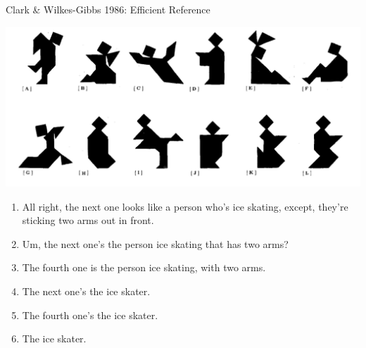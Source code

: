 \documentclass[ 12pt, xcolor=beamer,table,usenames,dvipsnames, ignorenonframetext, ngerman]{beamer}
\begin{document}
\begin{frame}{\large Clark \& Wilkes-Gibbs 1986: Efficient Reference}
	\pause
	\vspace{-.2cm}
	\begin{center}
		\includegraphics[width=.7\textwidth]{../images/clark_tangrams.png}
	\end{center}
	\vspace{-.4cm}
	\pause
	\begin{small}
		\begin{enumerate}
			\setlength{\itemsep}{-2pt}
			
			\item All right, the next one looks like a person who's ice skating, except, they're sticking two arms out in front. \pause
			\item Um, the next one's the person ice skating that has two arms? \pause
			\item The fourth one is the person ice skating, with two arms. \pause
			\item The next one's the ice skater. \pause
			\item The fourth one's the ice skater. \pause
			\item The ice skater.
		\end{enumerate}
	\end{small}
\end{frame}
\end{document}
